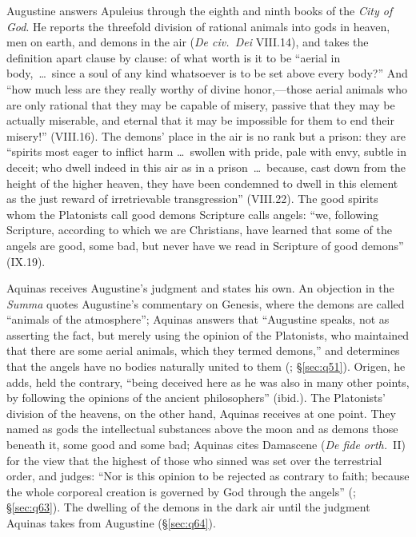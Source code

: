 Augustine answers Apuleius through the eighth and ninth books of the
\emph{City of God}. He reports the threefold division of rational
animals into gods in heaven, men on earth, and demons in the air
(\emph{De civ.\ Dei} VIII.14), and takes the definition apart clause by
clause: of what worth is it to be ``aerial in body,~\dots\ since a soul
of any kind whatsoever is to be set above every body?'' And ``how much
less are they really worthy of divine honor,---those aerial animals who
are only rational that they may be capable of misery, passive that they
may be actually miserable, and eternal that it may be impossible for
them to end their misery!'' (VIII.16). The demons' place in the air is
no rank but a prison: they are ``spirits most eager to inflict harm
\dots\ swollen with pride, pale with envy, subtle in deceit; who dwell
indeed in this air as in a prison~\dots\ because, cast down from the
height of the higher heaven, they have been condemned to dwell in this
element as the just reward of irretrievable transgression'' (VIII.22). The good
spirits whom the Platonists call good demons Scripture calls angels:
``we, following Scripture, according to which we are Christians, have
learned that some of the angels are good, some bad, but never have we
read in Scripture of good demons'' (IX.19).

Aquinas receives Augustine's judgment and states his own. An objection
in the \emph{Summa} quotes Augustine's commentary on Genesis, where the
demons are called ``animals of the atmosphere''; Aquinas answers that ``Augustine speaks, not as asserting the
fact, but merely using the opinion of the Platonists, who maintained that
there are some aerial animals, which they termed demons,'' and
determines that the angels have no bodies naturally united to them
(; \S\ref{sec:q51}). Origen, he adds, held the
contrary, ``being deceived here as he was also in many other points, by
following the opinions of the ancient philosophers'' (ibid.). The
Platonists' division of the heavens, on the other hand, Aquinas receives
at one point. They named as gods the intellectual substances above the
moon and as demons those beneath it, some good and some bad; Aquinas
cites Damascene (\emph{De fide orth.}\ II) for the view that the highest
of those who sinned was set over the terrestrial order, and judges:
``Nor is this opinion to be rejected as contrary to faith;
because the whole corporeal creation is governed by God through the
angels'' (; \S\ref{sec:q63}). The dwelling of the demons
in the dark air until the judgment Aquinas takes from Augustine
(\S\ref{sec:q64}).

